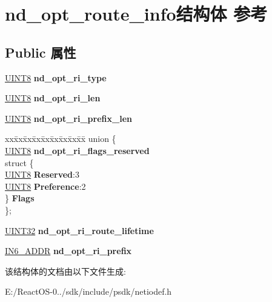 \hypertarget{structnd__opt__route__info}{}\section{nd\+\_\+opt\+\_\+route\+\_\+info结构体 参考}
\label{structnd__opt__route__info}
\subsection*{Public 属性}
\begin{DoxyCompactItemize}
\item 
\mbox{\label{structnd__opt__route__info_af769eff313c849257842a5879cd910e3}} 
\hyperlink{_processor_bind_8h_ab27e9918b538ce9d8ca692479b375b6a}{U\+I\+N\+T8} {\bfseries nd\+\_\+opt\+\_\+ri\+\_\+type}
\item 
\mbox{\label{structnd__opt__route__info_a9086ce084be7dcd9bd61d7ad968589c7}} 
\hyperlink{_processor_bind_8h_ab27e9918b538ce9d8ca692479b375b6a}{U\+I\+N\+T8} {\bfseries nd\+\_\+opt\+\_\+ri\+\_\+len}
\item 
\mbox{\label{structnd__opt__route__info_ac0cde9d925bb36fe02eec87053bb1c8d}} 
\hyperlink{_processor_bind_8h_ab27e9918b538ce9d8ca692479b375b6a}{U\+I\+N\+T8} {\bfseries nd\+\_\+opt\+\_\+ri\+\_\+prefix\+\_\+len}
\item 
\mbox{\label{structnd__opt__route__info_a5d9edf65918f14c532ed318fc3afaaa2}} 
\begin{tabbing}
xx\=xx\=xx\=xx\=xx\=xx\=xx\=xx\=xx\=\kill
union \{\\
\>\hyperlink{_processor_bind_8h_ab27e9918b538ce9d8ca692479b375b6a}{UINT8} {\bfseries nd\_opt\_ri\_flags\_reserved}\\
\>struct \{\\
\>\>\hyperlink{_processor_bind_8h_ab27e9918b538ce9d8ca692479b375b6a}{UINT8} {\bfseries Reserved}:3\\
\>\>\hyperlink{_processor_bind_8h_ab27e9918b538ce9d8ca692479b375b6a}{UINT8} {\bfseries Preference}:2\\
\>\} {\bfseries Flags}\\
\}; \\

\end{tabbing}\item 
\mbox{\label{structnd__opt__route__info_a9651062f0922b43eeec714e76cf1ff1f}} 
\hyperlink{_processor_bind_8h_ae1e6edbbc26d6fbc71a90190d0266018}{U\+I\+N\+T32} {\bfseries nd\+\_\+opt\+\_\+ri\+\_\+route\+\_\+lifetime}
\item 
\mbox{\label{structnd__opt__route__info_a36c921e512e8bfff4cbcb6bee3d40fb7}} 
\hyperlink{structin6__addr}{I\+N6\+\_\+\+A\+D\+DR} {\bfseries nd\+\_\+opt\+\_\+ri\+\_\+prefix}
\end{DoxyCompactItemize}


该结构体的文档由以下文件生成\+:\begin{DoxyCompactItemize}
\item 
E\+:/\+React\+O\+S-\/0../sdk/include/psdk/netiodef.\+h\end{DoxyCompactItemize}
